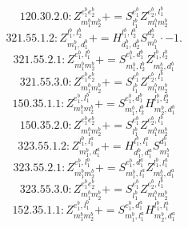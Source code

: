\documentclass[letterpaper,10pt,fleqn,leqno,onecolumn]{article}
\begin{document}
\begin{equation} \;\;\;\;\;\;  120.30.2.0: Z^{e_{1}^{b}e_{2}^{b}}_{m_{1}^{b}m_{2}^{b}}+=S^{e_{1}^{b}}_{l_{1}^{b}}Z^{e_{2}^{b},l_{1}^{b}}_{m_{1}^{b}m_{2}^{b}} \end{equation}
\begin{equation} \;\;\;\;\;\;  321.55.1.2: Z^{l_{1}^{b},l_{2}^{b}}_{m_{1}^{b},d_{1}^{b}}+=H^{l_{1}^{b},l_{2}^{b}}_{d_{1}^{b},d_{2}^{b}}S^{d_{2}^{b}}_{m_{1}^{b}}\cdot -1. \end{equation}
\begin{equation} \;\;\;\;\;\;  321.55.2.1: Z^{e_{1}^{b},l_{1}^{b}}_{m_{1}^{b}m_{2}^{b}}+=S^{e_{1}^{b},d_{1}^{b}}_{m_{1}^{b},l_{2}^{b}}Z^{l_{1}^{b},l_{2}^{b}}_{m_{2}^{b},d_{1}^{b}} \end{equation}
\begin{equation} \;\;\;\;\;\;  321.55.3.0: Z^{e_{1}^{b}e_{2}^{b}}_{m_{1}^{b}m_{2}^{b}}+=S^{e_{1}^{b}}_{l_{1}^{b}}Z^{e_{2}^{b},l_{1}^{b}}_{m_{1}^{b}m_{2}^{b}} \end{equation}
\begin{equation} \;\;\;\;\;\;  150.35.1.1: Z^{e_{1}^{b},l_{1}^{b}}_{m_{1}^{b}m_{2}^{b}}+=S^{e_{1}^{b},d_{1}^{b}}_{m_{1}^{b},l_{2}^{b}}H^{l_{1}^{b},l_{2}^{b}}_{m_{2}^{b},d_{1}^{b}} \end{equation}
\begin{equation} \;\;\;\;\;\;  150.35.2.0: Z^{e_{1}^{b}e_{2}^{b}}_{m_{1}^{b}m_{2}^{b}}+=S^{e_{1}^{b}}_{l_{1}^{b}}Z^{e_{2}^{b},l_{1}^{b}}_{m_{1}^{b}m_{2}^{b}} \end{equation}
\begin{equation} \;\;\;\;\;\;  323.55.1.2: Z^{l_{1}^{b},l_{1}^{a}}_{m_{1}^{b},d_{1}^{a}}+=H^{l_{1}^{b},l_{1}^{a}}_{d_{1}^{b},d_{1}^{a}}S^{d_{1}^{b}}_{m_{1}^{b}} \end{equation}
\begin{equation} \;\;\;\;\;\;  323.55.2.1: Z^{e_{1}^{b},l_{1}^{b}}_{m_{1}^{b}m_{2}^{b}}+=S^{e_{1}^{b},d_{1}^{a}}_{m_{1}^{b},l_{1}^{a}}Z^{l_{1}^{b},l_{1}^{a}}_{m_{2}^{b},d_{1}^{a}} \end{equation}
\begin{equation} \;\;\;\;\;\;  323.55.3.0: Z^{e_{1}^{b}e_{2}^{b}}_{m_{1}^{b}m_{2}^{b}}+=S^{e_{1}^{b}}_{l_{1}^{b}}Z^{e_{2}^{b},l_{1}^{b}}_{m_{1}^{b}m_{2}^{b}} \end{equation}
\begin{equation} \;\;\;\;\;\;  152.35.1.1: Z^{e_{1}^{b},l_{1}^{b}}_{m_{1}^{b}m_{2}^{b}}+=S^{e_{1}^{b},d_{1}^{a}}_{m_{1}^{b},l_{1}^{a}}H^{l_{1}^{b},l_{1}^{a}}_{m_{2}^{b},d_{1}^{a}} \end{equation}
\end{document}
